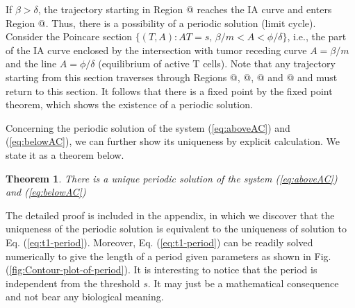 \documentclass[review,authoryear]{elsarticle}
\makeatletter
\newtheorem{theorem}{Theorem}
\newcommand*{\rom}[1]{\expandafter\@slowromancap\romannumeral #1@}
\makeatother
\begin{document}
If $\beta>\delta$, the trajectory starting in Region \rom{2} reaches the IA curve 
and enters Region \rom{3}. Thus, there is a possibility of a periodic solution (limit cycle). Consider
the Poincare section $\{(T,A):AT=s,\,\beta/m<A<\phi/\delta \}$, i.e., the part of the IA curve enclosed by 
the intersection with tumor receding curve $A=\beta/m$ 
and the line $A=\phi / \delta$ (equilibrium of active T cells).
Note that any trajectory starting from this section traverses through Regions \rom{1}, \rom{2}, \rom{3} and \rom{4} and must
return to this section. It follows that there is
a fixed point by the fixed point theorem, which shows the existence of a periodic solution. 

Concerning the periodic solution of the system (\ref{eq:aboveAC}) and (\ref{eq:belowAC}), we can further show its uniqueness by explicit calculation. We state it as a theorem below.  
\begin{theorem} \label{thm:unique}
There is a unique periodic solution of the system (\ref{eq:aboveAC}) and (\ref{eq:belowAC})
\end{theorem}
 The detailed proof is included in the appendix, in which we discover that the uniqueness of the periodic solution is equivalent to the uniqueness of solution to Eq. (\ref{eq:t1-period}). Moreover, Eq. (\ref{eq:t1-period}) can be readily
solved numerically to give the length of a period given parameters
as shown in Fig. (\ref{fig:Contour-plot-of-period}). It is interesting
to notice that the period is independent from the threshold $s$.
It may just be a mathematical consequence and not bear any biological
meaning. 
\end{document}

